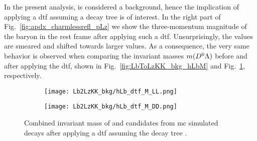 In the present analysis, \decay{\Lb}{\Lz\Km\Kp} is considered a background, hence the implication of applying a \gls{dtf} assuming a decay tree \decay{\Lb}{\Dz\Lz} is of interest.
In the right part of Fig.~\ref{fig:apdx_charmlessrefl_pLz} we show the three-momentum magnitude of the \Lz baryon in the \Lb rest frame after applying such a \gls{dtf}.
Unsurprisingly, the values are smeared and shifted towards larger values.
As a consequence, the very same behavior is observed when comparing the invariant masses $m({{D}^0}{\Lambda})$ before and after applying the \gls{dtf}, shown in Fig.~\ref{fig:LbToLzKK_bkg_hLbM} and Fig.~\ref{fig:apdx_charmlessrel_mLb_dtf}, respectively.

\begin{figure}[htbp]
    \centering
    \begin{subfigure}{.49\textwidth}
        \centering
        \texttt{[image: Lb2LzKK\_bkg/hLb\_dtf\_M\_LL.png]}
    \end{subfigure}
    \begin{subfigure}{.49\textwidth}
        \centering
        \texttt{[image: Lb2LzKK\_bkg/hLb\_dtf\_M\_DD.png]}
    \end{subfigure}
    \caption{Combined invariant mass of \decay{\Dz}{\Km\pip} and \decay{\Lz}{\proton\pim} candidates from \gls{mc} simulated \decay{\Lb}{\Lz\Km\Kp} decays after applying a \gls{dtf} assuming the decay tree \decay{\Lb}{\Dz\Lz}.}
    \label{fig:apdx_charmlessrel_mLb_dtf}
\end{figure}

